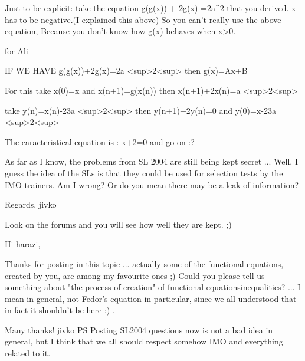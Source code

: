 \begin{solution}
	Just to be explicit:
take the equation g(g(x)) + 2g(x) =2a^2 that you derived.
x has to be negative.(I explained this above)
So you can't really use the above equation, Because you don't know how g(x) behaves when x>0.
\end{solution}



\begin{solution}
	for Ali


IF WE HAVE  g(g(x))+2g(x)=2a <sup>2<\/sup> then g(x)=Ax+B

For this take x(0)=x and x(n+1)=g(x(n)) then x(n+1)+2x(n)=a <sup>2<\/sup> 

take y(n)=x(n)-2\/3a <sup>2<\/sup>  then y(n+1)+2y(n)=0 and y(0)=x-2\/3a <sup>2<\/sup> 

The caracteristical equation is : x+2=0 and go on :?
\end{solution}



\begin{solution}
	As far as I know, the problems from SL 2004 are still being kept secret ... Well, I guess the idea of the SLs is that they could be used for selection tests by the IMO trainers. Am I wrong? Or do you mean there may be a leak of information?

Regards,
jivko
\end{solution}



\begin{solution}
	Look on the forums and you will see how well they are kept.  ;)
\end{solution}



\begin{solution}
	Hi harazi,


Thanks for posting in this topic ... actually some of the functional equations, created by you, are among my favourite ones  ;)  Could you please tell us something about "the process of creation" of functional equations\/inequalities? ... I mean in general, not Fedor's equation in particular, since we all understood that in fact it shouldn't be here  :) .

Many thanks!
jivko
PS Posting SL2004 questions now is not a bad idea in general, but I think that we all should respect somehow IMO and everything related to it.
\end{solution}



